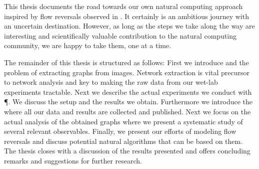 	This thesis documents the road towards our own natural computing approach inspired by flow reversals observed in \Pp. It certainly is an ambitious journey with an uncertain destination. However, as long as the steps we take along the way are interesting and scientifically valuable contribution to the natural computing community, we are happy to take them, one at a time.

	The remainder of this thesis is structured as follows: First we introduce \NEFI and the problem of extracting graphs from images. Network extraction is vital precursor to network analysis and key to making the raw data from our wet-lab experiments tractable. Next we describe the actual experiments we conduct with \P. We discuss the setup and the results we obtain. Furthermore we introduce the \SMGR where all our data and results are collected and published. Next we focus on the actual analysis of the obtained graphs where we present a systematic study of several relevant observables. Finally, we present our efforts of modeling flow reversals and discuss potential natural algorithms that can be based on them. The thesis closes with a discussion of the results presented and offers concluding remarks and suggestions for further research.













